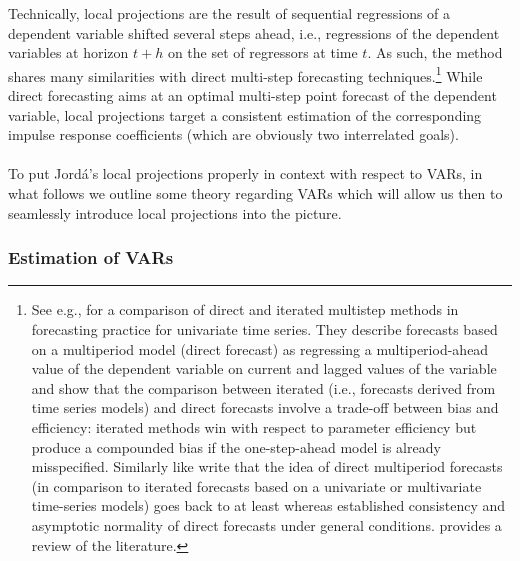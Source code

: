 \documentclass[a4paper,11pt,listof=nochaptergap,oneside,pointednumbers,bibtotoc,bigheadings,liststotoc]{scrbook}
\theoremstyle{mysatz}
\theoremstyle{mydefinition}
\theoremstyle{mybemerkung}
\renewcommand*{\paragraph}[1]{\subsubsection*{#1} \vspace{-3mm}} %
\begin{document}
\begin{itemize}
Technically, local projections are the result of sequential regressions of a dependent variable shifted several steps ahead, i.e., regressions of the dependent variables at horizon $t+h$ on the set of regressors at time $t$. As such, the method shares many similarities with direct multi-step forecasting techniques.\footnote{See e.g., \citet{marcellinoetal:06} for a comparison of direct and iterated multistep methods in forecasting practice for univariate time series. They describe forecasts based on a multiperiod model (direct forecast) as regressing a multiperiod-ahead value of the dependent variable on current and lagged values of the variable and show that the comparison between iterated (i.e., forecasts derived from time series models) and direct forecasts involve a trade-off between bias and efficiency: iterated methods win with respect to parameter efficiency but produce a compounded bias if the one-step-ahead model is already misspecified. Similarly like \citet{jorda:05} write that the idea of direct multiperiod forecasts (in comparison to iterated forecasts based on a univariate or multivariate time-series models) goes back to at least \citet{cox:61} whereas \citet{weiss:91} established consistency and asymptotic normality of direct forecasts under general conditions. \citet{bhansali:02} provides a review of the literature.} While direct forecasting aims at an optimal multi-step point forecast of the dependent variable, local projections target a consistent estimation of the corresponding impulse response coefficients (which are obviously two interrelated goals).\\
\\
To put Jordá's local projections properly in context with respect to VARs, in what follows we outline some theory regarding VARs which will allow us then to seamlessly introduce local projections into the picture.

\endgroup









\paragraph{Estimation of VARs}



\end{itemize}
\end{document}
